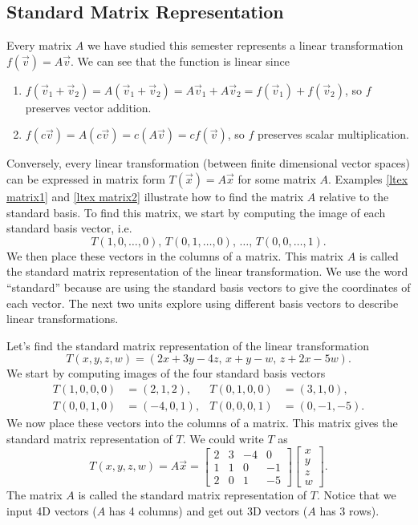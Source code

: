 \subsection{Standard Matrix Representation}
Every matrix $A$ we have studied this semester represents a linear transformation $f(\vec v)=A\vec v$. We can see that the function is linear since
\begin{enumerate}
\item $f(\vec v_1+\vec v_2)=A(\vec v_1+\vec v_2)=A\vec v_1+A\vec v_2=f(\vec v_1)+f(\vec v_2)$, so $f$ preserves vector addition.

\item $f(c\vec v)=A(c\vec v)=c(A\vec v)=cf(\vec v)$, so $f$ preserves scalar multiplication.
\end{enumerate}

Conversely, every linear transformation (between finite dimensional vector spaces) can be expressed in matrix form $T(\vec x)=A\vec x$ for some matrix $A$.  Examples \ref{ltex matrix1} and \ref{ltex matrix2} illustrate how to find the matrix $A$ relative to the standard basis.  To find this matrix, we start by computing the image of each standard basis vector, i.e. $$T(1,0,\ldots,0),\,T(0,1,\ldots,0),\, \ldots,\,T(0,0,\ldots,1).$$ We then place these vectors in the columns of a matrix.  This matrix $A$ is called the standard matrix representation of the linear transformation. We use the word ``standard'' because are using the standard basis vectors to give the coordinates of each vector.  The next two units explore using different basis vectors to describe linear transformations.

\begin{example} Let's find the standard matrix representation of the
  linear transformation $$T(x,y,z,w)=(2x+3y-4z,\,x+y-w,\,z+2x-5w).$$
  We start by computing images of the four standard basis vectors
  \begin{align*}
    T(1,0,0,0)&=(2,1,2), & T(0,1,0,0)&=(3,1,0),\\
    T(0,0,1,0)&=(-4,0,1), & T(0,0,0,1)&=(0,-1,-5).
  \end{align*}
We now place these vectors into the columns of a matrix.  This matrix gives the standard matrix representation of $T$.  We could write $T$ as
$$T(x,y,z,w)=A\vec x=
\begin{bmatrix}
2&3&-4&0\\
1&1&0 &-1\\
2&0&1 &-5
\end{bmatrix}
\begin{bmatrix}
x\\
y\\
z\\
w
\end{bmatrix}.$$ 
The matrix $A$ is called the standard matrix representation of $T$. 
% 
Notice that we input 4D vectors ($A$ has 4 columns) and get out 3D vectors ($A$ has 3 rows).  
\end{example}

